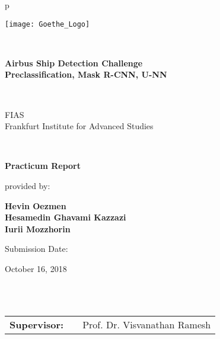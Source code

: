 \begin{center}
\begin{tabular}{p{\textwidth}}

\begin{center}
\texttt{[image: Goethe\_Logo]}
\end{center}

\\
\nocite{*}
\begin{center}
\LARGE{\textbf{Airbus Ship Detection Challenge \\
Preclassification, Mask R-CNN, U-NN}}
\end{center}

\\


\begin{center}
\large{FIAS \\
Frankfurt Institute for Advanced Studies \\}
\end{center}

\\

\begin{center}
\textbf{\Large{Practicum Report}}
\end{center}


\begin{center}
provided by:
\end{center}

\begin{center}
\large{\textbf{Hevin Oezmen \\
Hesamedin Ghavami Kazzazi \\
Iurii Mozzhorin}} \\
\end{center}

\begin{center}
Submission Date:
\end{center}

\begin{center}
\large{October 16, 2018}
\end{center}

\\

\\

\begin{center}
\begin{tabular}{lll}
\textbf{Supervisor:} & & Prof. Dr. Visvanathan Ramesh\\
\end{tabular}
\end{center}

\end{tabular}
\end{center}